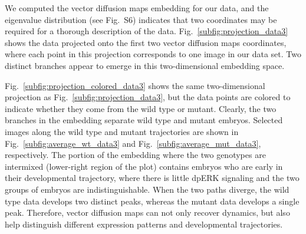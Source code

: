 \documentclass{pnastwo}
\newcommand{\fig}[0]{Fig.}
\begin{document}
\begin{article}
We computed the vector diffusion maps embedding for our data, and the eigenvalue distribution (see \fig~S6) indicates that two coordinates may be required for a thorough description of the data. 
%
\fig~\ref{subfig:projection_data3} shows the data projected onto the first two vector diffusion maps coordinates, where each point in this projection corresponds to one image in our data set.
%
Two distinct branches appear to emerge in this two-dimensional embedding space.



\fig~\ref{subfig:projection_colored_data3} shows the same two-dimensional projection as \fig~\ref{subfig:projection_data3}, but the data points are colored to indicate whether they come from the wild type or mutant.
%
Clearly, the two branches in the embedding separate wild type and mutant embryos.
%
Selected images along the wild type and mutant trajectories are shown in \fig~\ref{subfig:average_wt_data3} and \fig~\ref{subfig:average_mut_data3}, respectively.
%
The portion of the embedding where the two genotypes are intermixed (lower-right region of the plot) contains embryos who are early in their developmental trajectory, where there is little dpERK signaling and the two groups of embryos are indistinguishable. 
%
When the two paths diverge, the wild type data develops two distinct peaks, whereas the mutant data develops a single peak.
%
Therefore, vector diffusion maps can not only recover dynamics, but also help distinguish different expression patterns and developmental trajectories.


\end{article}
\end{document}
